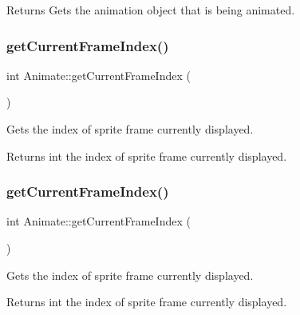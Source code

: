 \begin{DoxyReturn}{Returns}
Gets the animation object that is being animated. 
\end{DoxyReturn}
\mbox{\label{classAnimate_a0817746a8202c5e57b45762ada7e7a32}} 
\subsubsection{\texorpdfstring{get\+Current\+Frame\+Index()}{getCurrentFrameIndex()}\hspace{0.1cm}{\footnotesize\ttfamily [1/2]}}
{\footnotesize\ttfamily int Animate\+::get\+Current\+Frame\+Index (\begin{DoxyParamCaption}{ }\end{DoxyParamCaption})\hspace{0.3cm}{\ttfamily [inline]}}

Gets the index of sprite frame currently displayed. \begin{DoxyReturn}{Returns}
int the index of sprite frame currently displayed. 
\end{DoxyReturn}
\mbox{\label{classAnimate_a0817746a8202c5e57b45762ada7e7a32}} 
\subsubsection{\texorpdfstring{get\+Current\+Frame\+Index()}{getCurrentFrameIndex()}\hspace{0.1cm}{\footnotesize\ttfamily [2/2]}}
{\footnotesize\ttfamily int Animate\+::get\+Current\+Frame\+Index (\begin{DoxyParamCaption}{ }\end{DoxyParamCaption})\hspace{0.3cm}{\ttfamily [inline]}}

Gets the index of sprite frame currently displayed. \begin{DoxyReturn}{Returns}
int the index of sprite frame currently displayed. 
\end{DoxyReturn}
\mbox{\label{classAnimate_a12360cf2067d0dfa3470ff2a3c248c34}} 
